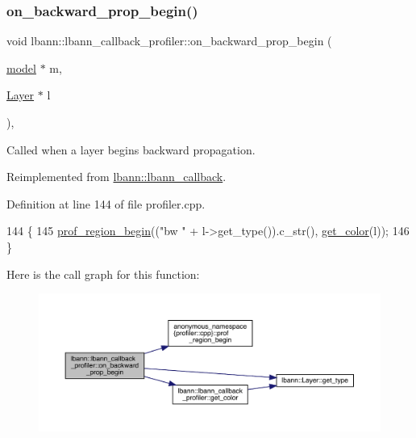 \subsubsection{\texorpdfstring{on\+\_\+backward\+\_\+prop\+\_\+begin()}{on\_backward\_prop\_begin()}\hspace{0.1cm}{\footnotesize\ttfamily [2/2]}}
{\footnotesize\ttfamily void lbann\+::lbann\+\_\+callback\+\_\+profiler\+::on\+\_\+backward\+\_\+prop\+\_\+begin (\begin{DoxyParamCaption}\item[{\hyperlink{classlbann_1_1model}{model} $\ast$}]{m,  }\item[{\hyperlink{classlbann_1_1Layer}{Layer} $\ast$}]{l }\end{DoxyParamCaption})\hspace{0.3cm}{\ttfamily [override]}, {\ttfamily [virtual]}}

Called when a layer begins backward propagation. 

Reimplemented from \hyperlink{classlbann_1_1lbann__callback_abeb1e486e259fd358332abf1e952f630}{lbann\+::lbann\+\_\+callback}.



Definition at line 144 of file profiler.\+cpp.


\begin{DoxyCode}
144                                                                        \{
145   \hyperlink{namespaceanonymous__namespace_02profiler_8cpp_03_ad2ea0278cd1f25dc30ddd76194ace64b}{prof\_region\_begin}((\textcolor{stringliteral}{"bw "} + l->get\_type()).c\_str(), \hyperlink{classlbann_1_1lbann__callback__profiler_af78237a67eaacf2508f31ad72b8ff8a7}{get\_color}(l));    
146 \}
\end{DoxyCode}
Here is the call graph for this function\+:\nopagebreak
\begin{figure}[H]
\begin{center}
\leavevmode
\includegraphics[width=350pt]{classlbann_1_1lbann__callback__profiler_a158d8d47bd7a2e38a1f5589030fa523b_cgraph}
\end{center}
\end{figure}
\mbox{\label{classlbann_1_1lbann__callback__profiler_a8a4ba2640d128992a519ab4a2b7c44aa}} 
